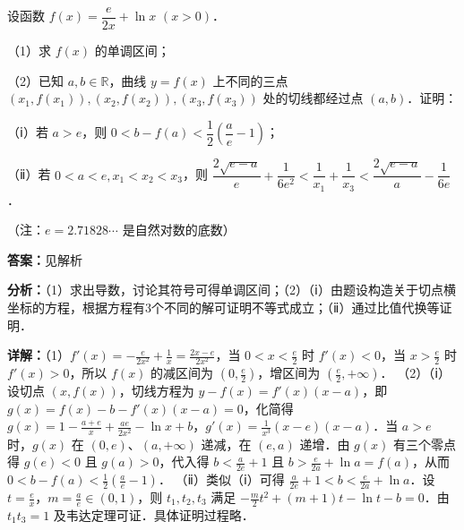 \begin{question}[points=15]
设函数 $f(x) = \dfrac{e}{2x} + \ln x$ $(x>0)$．

（1）求 $f(x)$ 的单调区间；

（2）已知 $a,b \in \mathbb{R}$，曲线 $y=f(x)$ 上不同的三点 $(x_1, f(x_1)), (x_2, f(x_2)), (x_3, f(x_3))$ 处的切线都经过点 $(a,b)$．证明：

（ⅰ）若 $a>e$，则 $0 < b - f(a) < \dfrac{1}{2}\left(\dfrac{a}{e} - 1\right)$；

（ⅱ）若 $0<a<e, x_1<x_2<x_3$，则 $\dfrac{2\sqrt{e-a}}{e} + \dfrac{1}{6e^2} < \dfrac{1}{x_1} + \dfrac{1}{x_3} < \dfrac{2\sqrt{e-a}}{a} - \dfrac{1}{6e}$．

（注：$e=2.71828\cdots$ 是自然对数的底数）
\begin{solution}
\textbf{答案：}见解析

\textbf{分析：}（1）求出导数，讨论其符号可得单调区间；（2）（ⅰ）由题设构造关于切点横坐标的方程，根据方程有3个不同的解可证明不等式成立；（ⅱ）通过比值代换等证明．

\textbf{详解：}（1）$f'(x) = -\frac{e}{2x^2} + \frac{1}{x} = \frac{2x-e}{2x^2}$，当 $0<x<\frac{e}{2}$ 时 $f'(x)<0$，当 $x>\frac{e}{2}$ 时 $f'(x)>0$，所以 $f(x)$ 的减区间为 $(0,\frac{e}{2})$，增区间为 $(\frac{e}{2},+\infty)$．
（2）（ⅰ）设切点 $(x,f(x))$，切线方程为 $y-f(x)=f'(x)(x-a)$，即 $g(x)=f(x)-b-f'(x)(x-a)=0$，化简得 $g(x)=1-\frac{a+e}{x}+\frac{ae}{2x^2}-\ln x+b$，$g'(x)=\frac{1}{x^3}(x-e)(x-a)$．当 $a>e$ 时，$g(x)$ 在 $(0,e)$、$(a,+\infty)$ 递减，在 $(e,a)$ 递增．由 $g(x)$ 有三个零点得 $g(e)<0$ 且 $g(a)>0$，代入得 $b<\frac{a}{2e}+1$ 且 $b>\frac{e}{2a}+\ln a=f(a)$，从而 $0<b-f(a)<\frac{1}{2}\left(\frac{a}{e}-1\right)$．
（ⅱ）类似（ⅰ）可得 $\frac{a}{2e}+1<b<\frac{e}{2a}+\ln a$．设 $t=\frac{e}{x}$，$m=\frac{a}{e}\in(0,1)$，则 $t_1,t_2,t_3$ 满足 $-\frac{m}{2}t^2+(m+1)t-\ln t-b=0$．由 $t_1t_3=1$ 及韦达定理可证．具体证明过程略．
\end{solution}
\end{question}


